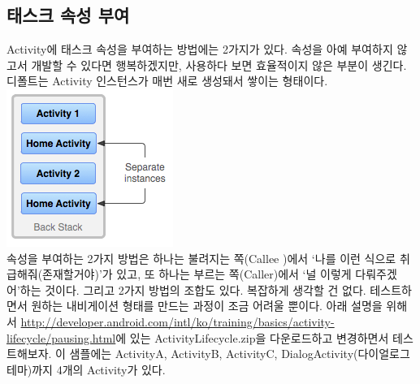 
\subsection{태스크 속성 부여}
Activity에 태스크 속성을 부여하는 방법에는 2가지가 있다. 속성을 아예 부여하지 않고서 개발할 수 있다면 행복하겠지만, 사용하다 보면 효율적이지 않은 부분이 생긴다.
디폴트는 Activity 인스턴스가 매번 새로 생성돼서 쌓이는 형태이다.\\
\includegraphics[scale=0.7]{diagram_multiple_instances}\\
속성을 부여하는 2가지 방법은 하나는 불려지는 쪽(Callee )에서 `나를 이런 식으로 취급해줘(존재할거야)'가 있고, 또 하나는 부르는 쪽(Caller)에서 `널 이렇게 다뤄주겠어'하는 것이다. 그리고 2가지 방법의 조합도 있다.
복잡하게 생각할 건 없다. 테스트하면서 원하는 내비게이션 형태를 만드는 과정이 조금 어려울 뿐이다.
아래 설명을 위해서 \url{http://developer.android.com/intl/ko/training/basics/activity-lifecycle/pausing.html}에 있는 ActivityLifecycle.zip을 다운로드하고 변경하면서 테스트해보자. 
이 샘플에는 ActivityA, ActivityB, ActivityC, DialogActivity(다이얼로그 테마)까지 4개의 Activity가 있다.

